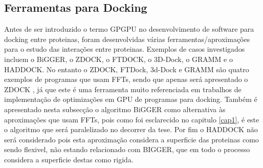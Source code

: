 \subsection{Ferramentas para Docking}
Antes de ser introduzido o termo GPGPU no desenvolvimento de software para docking entre proteinas, foram desenvolvidas várias ferramentas/aproximações para o estudo das interações entre proteinas. Exemplos de casos investigados incluem o BiGGER, o ZDOCK, o FTDOCK, o 3D-Dock, o GRAMM\cite{prediction} e o HADDOCK. No entanto o ZDOCK, FTDock, 3d-Dock e GRAMM são quatro exemplos de programas que usam FFTs, sendo que apenas será apresentado o ZDOCK \cite{zdock}, já que este é uma ferramenta muito referenciada em trabalhos de implementação de optimizações em GPU de programas para docking. Também é apresentado nesta subsecção o algoritmo BiGGER \cite{biggerPaper} como alternativa às aproximações que usam FFTs, pois como foi esclarecido no capitulo \ref{cap1}, é este o algoritmo que será paralelizado no decorrer da tese. Por fim o HADDOCK \cite{dominguez2003haddock} não será considerado pois esta aproximação considera a superficie das proteinas como sendo flexivel, não estando relacionado com BIGGER, que em todo o processo considera a superficie destas como rigida.
